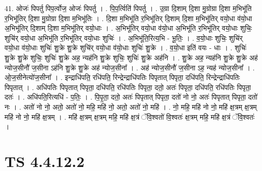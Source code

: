 \documentclass[17pt]{extarticle}
\begin{document}
41. ओजः॑ पिपर्तु पिप॒र्त्वोज॒ ओजः॑ पिपर्तु । . पि॒प॒र्त्विति॑ पिपर्तु । . उ॒ग्रा दि॒शाम् दि॒शा मु॒ग्रोग्रा दि॒शा म॒भिभू॑ति र॒भिभू॑तिर् दि॒शा मु॒ग्रोग्रा दि॒शा म॒भिभू॑तिः । . दि॒शा म॒भिभू॑ति र॒भिभू॑तिर् दि॒शाम् दि॒शा म॒भिभू॑तिर् वयो॒धा व॑यो॒धा अ॒भिभू॑तिर् दि॒शाम् दि॒शा म॒भिभू॑तिर् वयो॒धाः । . अ॒भिभू॑तिर् वयो॒धा व॑यो॒धा अ॒भिभू॑ति र॒भिभू॑तिर् वयो॒धाः शुचिः॒ शुचि॑र् वयो॒धा अ॒भिभू॑ति र॒भिभू॑तिर् वयो॒धाः शुचिः॑ । . अ॒भिभू॑ति॒रित्य॒भि - भू॒तिः॒ । . व॒यो॒धाः शुचिः॒ शुचि॑र् वयो॒धा व॑यो॒धाः शुचिः॑ शु॒क्रे शु॒क्रे शुचि॑र् वयो॒धा व॑यो॒धाः शुचिः॑ शु॒क्रे । . व॒यो॒धा इति॑ वयः - धाः । . शुचिः॑ शु॒क्रे शु॒क्रे शुचिः॒ शुचिः॑ शु॒क्रे अह॒ न्यह॑नि शु॒क्रे शुचिः॒ शुचिः॑ शु॒क्रे अह॑नि । . शु॒क्रे अह॒ न्यह॑नि शु॒क्रे शु॒क्रे अह॑ न्योज॒सीनौ॑ ज॒सीना ऽह॑नि शु॒क्रे शु॒क्रे अह॑ न्योज॒सीना᳚ । . अह॑ न्योज॒सीनौ॑ ज॒सीना ऽह॒ न्यह॑ न्योज॒सीना᳚ । . ओ॒ज॒सीनेत्यो॑ज॒सीना᳚ । . इन्द्राधि॑पति॒ रधि॑पति॒ रिन्द्रेन्द्राधि॑पतिः पिपृतात् पिपृता॒ दधि॑पति॒ रिन्द्रेन्द्राधि॑पतिः पिपृतात् । . अधि॑पतिः पिपृतात् पिपृता॒ दधि॑पति॒ रधि॑पतिः पिपृता॒ दतो॒ अतः॑ पिपृता॒ दधि॑पति॒ रधि॑पतिः पिपृता॒ दतः॑ । . अधि॑पति॒रित्यधि॑ - प॒तिः॒ । . पि॒पृ॒ता॒ दतो॒ अतः॑ पिपृतात् पिपृता॒ दतो॑ नो नो॒ अतः॑ पिपृतात् पिपृता॒ दतो॑ नः । . अतो॑ नो नो॒ अतो॒ अतो॑ नो॒ महि॒ महि॑ नो॒ अतो॒ अतो॑ नो॒ महि॑ । . नो॒ महि॒ महि॑ नो नो॒ महि॑ क्ष॒त्रम् क्ष॒त्रम् महि॑ नो नो॒ महि॑ क्ष॒त्रम् । . महि॑ क्ष॒त्रम् क्ष॒त्रम् महि॒ महि॑ क्ष॒त्रं ॅवि॒श्वतो॑ वि॒श्वतः॑ क्ष॒त्रम् महि॒ महि॑ क्ष॒त्रं ॅवि॒श्वतः॑ । \newline
\pagebreak
{}

\section{ TS 4.4.12.2 }
\end{document}
